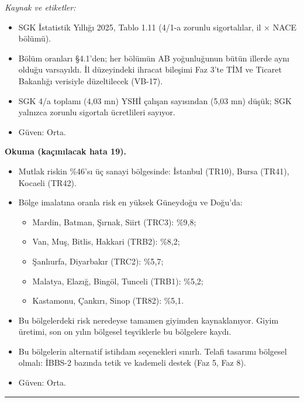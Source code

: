 \endgroup

\emph{Kaynak ve etiketler:}

\begin{itemize}
\tightlist
\item
  \etiketV{} SGK İstatistik Yıllığı 2025, Tablo 1.11 (4/1-a zorunlu sigortalılar, il × NACE bölümü).
\item
  \etiketT{} Bölüm oranları §4.1'den; her bölümün AB yoğunluğunun bütün illerde aynı olduğu varsayıldı. İl düzeyindeki ihracat bileşimi Faz 3'te TİM ve Ticaret Bakanlığı verisiyle düzeltilecek (VB-17).
\item
  SGK 4/a toplamı (4,03 mn) YSHİ çalışan sayısından (5,03 mn) düşük; SGK yalnızca zorunlu sigortalı ücretlileri sayıyor.
\item
  Güven: Orta.
\end{itemize}

\textbf{Okuma (kaçınılacak hata 19).}

\begin{itemize}
\tightlist
\item
  Mutlak riskin \%46'sı üç sanayi bölgesinde: İstanbul (TR10), Bursa (TR41), Kocaeli (TR42).
\item
  Bölge imalatına oranla risk en yüksek Güneydoğu ve Doğu'da:

  \begin{itemize}
  \tightlist
  \item
    Mardin, Batman, Şırnak, Siirt (TRC3): \%9,8;
  \item
    Van, Muş, Bitlis, Hakkari (TRB2): \%8,2;
  \item
    Şanlıurfa, Diyarbakır (TRC2): \%5,7;
  \item
    Malatya, Elazığ, Bingöl, Tunceli (TRB1): \%5,2;
  \item
    Kastamonu, Çankırı, Sinop (TR82): \%5,1.
  \end{itemize}
\item
  Bu bölgelerdeki risk neredeyse tamamen giyimden kaynaklanıyor. Giyim üretimi, son on yılın bölgesel teşviklerle bu bölgelere kaydı.
\item
  Bu bölgelerin alternatif istihdam seçenekleri sınırlı. Telafi tasarımı bölgesel olmalı: İBBS-2 bazında tetik ve kademeli destek (Faz 5, Faz 8).
\item
  \etiketT{} Güven: Orta.
\end{itemize}

\begin{center}\rule{0.5\linewidth}{0.5pt}\end{center}


